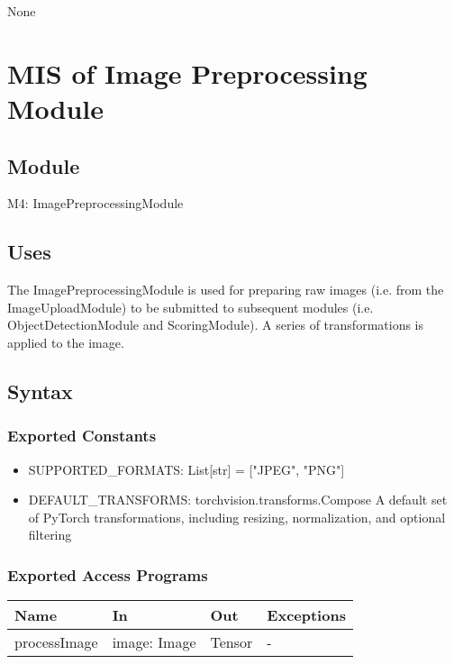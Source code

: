 \documentclass[12pt, titlepage]{article}
\begin{document}
None

\newpage



\section{MIS of Image Preprocessing Module} \label{Module} 

\subsection{Module}

M4: ImagePreprocessingModule

\subsection{Uses}
The ImagePreprocessingModule is used for preparing raw images (i.e. from the ImageUploadModule) to be submitted to subsequent modules (i.e. ObjectDetectionModule and ScoringModule). A series of transformations is applied to the image.

\subsection{Syntax}

\subsubsection{Exported Constants}

\begin{itemize}
  \item SUPPORTED{\_}FORMATS: List[str] = ["JPEG", "PNG"]
  \item DEFAULT{\_}TRANSFORMS: torchvision.transforms.Compose\: A default set of PyTorch transformations, including resizing, normalization, and optional filtering
\end{itemize}

\subsubsection{Exported Access Programs}

\begin{center}
\begin{tabular}{p{4cm} p{4cm} p{4cm} p{3.5cm}}
\hline
\textbf{Name} & \textbf{In} & \textbf{Out} & \textbf{Exceptions} \\
\hline
processImage & image: Image & Tensor & - \\
\hline
\end{tabular}
\end{center}
\end{document}
